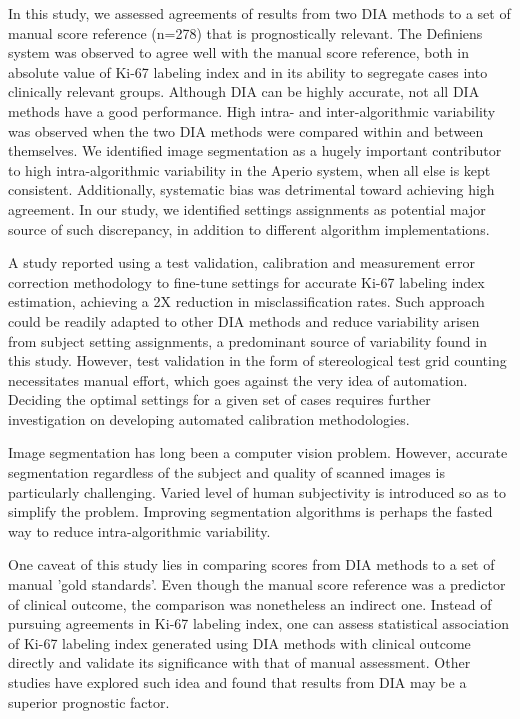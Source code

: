 \documentclass[final,5p,times,twocolumn]{elsarticle}
\begin{document}
In this study, we assessed agreements of results from two DIA methods to a set of manual score reference (n=278) that is prognostically relevant. The Definiens system was observed to agree well with the manual score reference, both in absolute value of Ki-67 labeling index and in its ability to segregate cases into clinically relevant groups. Although DIA can be highly accurate, not all DIA methods have a good performance. High intra- and inter-algorithmic variability was observed when the two DIA methods were compared within and between themselves. We identified image segmentation as a hugely important contributor to high intra-algorithmic variability in the Aperio system, when all else is kept consistent. Additionally, systematic bias was detrimental toward achieving high agreement. In our study, we identified settings assignments as potential major source of such discrepancy, in addition to different algorithm implementations.

A study reported using a test validation, calibration and measurement error correction methodology to fine-tune settings for accurate Ki-67 labeling index estimation, achieving a 2X reduction in misclassification rates. \cite{Laurinavicius2014} Such approach could be readily adapted to other DIA methods and reduce variability arisen from subject setting assignments, a predominant source of variability found in this study. However, test validation in the form of stereological test grid counting necessitates manual effort, which goes against the very idea of automation. Deciding the optimal settings for a given set of cases requires further investigation on developing automated calibration methodologies.

Image segmentation has long been a computer vision problem. However, accurate segmentation regardless of the subject and quality of scanned images is particularly challenging. Varied level of human subjectivity is introduced so as to simplify the problem. \cite{Tadrous2010} Improving segmentation algorithms is perhaps the fasted way to reduce intra-algorithmic variability.

One caveat of this study lies in comparing scores from DIA methods to a set of manual {'gold standards'}. Even though the manual score reference was a predictor of clinical outcome, the comparison was nonetheless an indirect one. Instead of pursuing agreements in Ki-67 labeling index, one can assess statistical association of Ki-67 labeling index generated using DIA methods with clinical outcome directly and validate its significance with that of manual assessment. Other studies have explored such idea and found that results from DIA may be a superior prognostic factor. \cite{Stalhammar2016}
\end{document}
